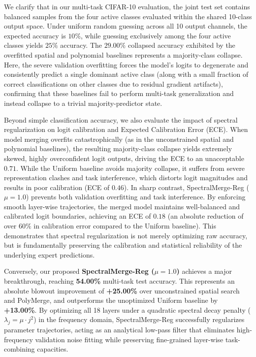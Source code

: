 We clarify that in our multi-task CIFAR-10 evaluation, the joint test set contains balanced samples from the four active classes evaluated within the shared 10-class output space. Under uniform random guessing across all 10 output channels, the expected accuracy is $10\%$, while guessing exclusively among the four active classes yields $25\%$ accuracy. The $29.00\%$ collapsed accuracy exhibited by the overfitted spatial and polynomial baselines represents a majority-class collapse. Here, the severe validation overfitting forces the model's logits to degenerate and consistently predict a single dominant active class (along with a small fraction of correct classifications on other classes due to residual gradient artifacts), confirming that these baselines fail to perform multi-task generalization and instead collapse to a trivial majority-predictor state.

Beyond simple classification accuracy, we also evaluate the impact of spectral regularization on logit calibration and Expected Calibration Error (ECE). When model merging overfits catastrophically (as in the unconstrained spatial and polynomial baselines), the resulting majority-class collapse yields extremely skewed, highly overconfident logit outputs, driving the ECE to an unacceptable $0.71$. While the Uniform baseline avoids majority collapse, it suffers from severe representation clashes and task interference, which distorts logit magnitudes and results in poor calibration (ECE of $0.46$). In sharp contrast, SpectralMerge-Reg ($\mu=1.0$) prevents both validation overfitting and task interference. By enforcing smooth layer-wise trajectories, the merged model maintains well-balanced and calibrated logit boundaries, achieving an ECE of $0.18$ (an absolute reduction of over $60\%$ in calibration error compared to the Uniform baseline). This demonstrates that spectral regularization is not merely optimizing raw accuracy, but is fundamentally preserving the calibration and statistical reliability of the underlying expert predictions.

Conversely, our proposed \textbf{SpectralMerge-Reg ($\mu=1.0$)} achieves a major breakthrough, reaching \textbf{54.00\%} multi-task test accuracy. This represents an absolute blowout improvement of \textbf{+25.00\%} over unconstrained spatial search and PolyMerge, and outperforms the unoptimized Uniform baseline by \textbf{+13.00\%}.
By optimizing all 18 layers under a quadratic spectral decay penalty ($\lambda_j = \mu \cdot j^2$) in the frequency domain, SpectralMerge-Reg successfully regularizes parameter trajectories, acting as an analytical low-pass filter that eliminates high-frequency validation noise fitting while preserving fine-grained layer-wise task-combining capacities.

